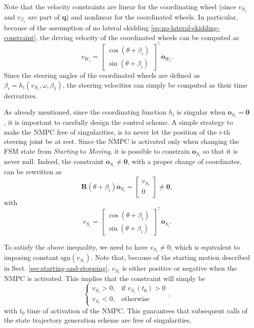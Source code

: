 Note that the velocity constraints are linear for the coordinating wheel
(since $v_{S_1}$ and $v_{\beta_1}$ are part of $\bm{q}$) and nonlinear for the
coordinated wheels. In particular, because of the assumption of no lateral
skidding \eqref{eq:no-lateral-skidding-constraint}, the driving velocity of
the coordinated wheels can be computed as
\begin{equation*}
    v_{W_i} = 
    \begin{bmatrix}
        \cos(\theta + \beta_i) \\
        \sin(\theta + \beta_i)
    \end{bmatrix}^\top \dot{\bm{o}}_{W_i}.
\end{equation*}
Since the steering angles of the coordinated wheels are defined as
$\beta_i=h_i(v_{S_1}, \omega, \beta_1)$, the steering velocities can simply be
computed as their time derivatives.

As already mentioned, since the coordinating function $h_i$ is singular when
$\dot{\bm{o}}_{S_i}=\bm{0}$, it is important to carefully design the control
scheme. A simple strategy to make the NMPC free of singularities, is to never
let the position of the $i$-th steering joint be at rest. Since the NMPC is
activated only when changing the FSM state from \textit{Starting} to
\textit{Moving}, it is possible to constrain $\dot{\bm{o}}_{S_i}$ so that it
is never null. Indeed, the constraint $\dot{\bm{o}}_{S_i} \ne \bm{0}$, with a
proper change of coordinates, can be rewritten as
\begin{equation*}
    \bm{R}(\theta + \beta_i) \dot{\bm{o}}_{S_i} =
    \begin{bmatrix}
        v_{S_i} \\ 0
    \end{bmatrix} \ne \bm{0},
\end{equation*}
with
\begin{equation*}
    v_{S_i} = 
    \begin{bmatrix}
        \cos(\theta + \beta_i) \\
        \sin(\theta + \beta_i)
    \end{bmatrix}^\top \dot{\bm{o}}_{S_i}.
\end{equation*}

To satisfy the above inequality, we need to have $v_{S_i} \ne 0$, which is
equivalent to imposing constant $\mathrm{sgn}(v_{S_i})$. Note that, because of
the starting motion described in Sect. \ref{sec:starting-and-stopping},
$v_{S_i}$ is either positive or negative when the NMPC is activated.
This implies that the constraint will simply be
\begin{equation*}
\begin{cases}
    v_{S_i} > 0, & \text{if $v_{S_i}(t_0)>0$} \\
    v_{S_i} < 0, & \text{otherwise}
\end{cases},
\end{equation*}
with $t_0$ time of activation of the NMPC. This guarantees that subsequent calls of
the state trajectory generation scheme are free of singularities.

